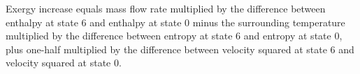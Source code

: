 Exergy increase equals mass flow rate multiplied by the difference between enthalpy at state 6 and enthalpy at state 0 minus the surrounding temperature multiplied by the difference between entropy at state 6 and entropy at state 0, plus one-half multiplied by the difference between velocity squared at state 6 and velocity squared at state 0.
